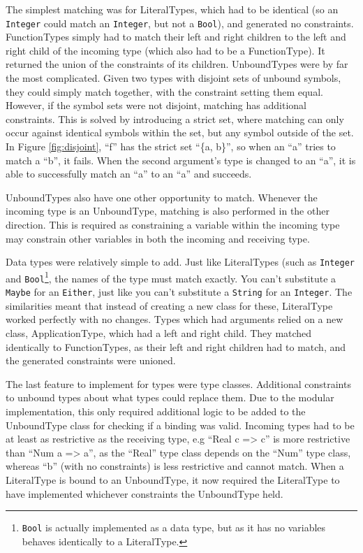 The simplest matching was for LiteralTypes, which had to be identical (so an \texttt{Integer} could match an \texttt{Integer}, but not a \texttt{Bool}), and generated no constraints.
FunctionTypes simply had to match their left and right children to the left and right child of the incoming type (which also had to be a FunctionType). It returned the union of the constraints of its children.
UnboundTypes were by far the most complicated. Given two types with disjoint sets of unbound symbols, they could simply match together, with the constraint setting them equal. However, if the symbol sets were not disjoint, matching has additional constraints. This is solved by introducing a strict set, where matching can only occur against identical symbols within the set, but any symbol outside of the set. In Figure \ref{fig:disjoint}, ``f'' has the strict set ``\{a, b\}'', so when an ``a'' tries to match a ``b'', it fails. When the second argument's type is changed to an ``a'', it is able to successfully match an ``a'' to an ``a'' and succeeds. 

UnboundTypes also have one other opportunity to match. Whenever the incoming type is an UnboundType, matching is also performed in the other direction. This is required as constraining a variable within the incoming type may constrain other variables in both the incoming and receiving type.

Data types were relatively simple to add. Just like LiteralTypes (such as \texttt{Integer} and \texttt{Bool}\footnote{\texttt{Bool} is actually implemented as a data type, but as it has no variables behaves identically to a LiteralType.}, the names of the type must match exactly. You can't substitute a \texttt{Maybe} for an \texttt{Either}, just like you can't substitute a \texttt{String} for an \texttt{Integer}. The similarities meant that instead of creating a new class for these, LiteralType worked perfectly with no changes.
Types which had arguments relied on a new class, ApplicationType, which had a left and right child. They matched identically to FunctionTypes, as their left and right children had to match, and the generated constraints were unioned.

The last feature to implement for types were type classes. Additional constraints to unbound types about what types could replace them. Due to the modular implementation, this only required additional logic to be added to the UnboundType class for checking if a binding was valid. Incoming types had to be at least as restrictive as the receiving type, e.g ``Real c => c'' is more restrictive than ``Num a => a'', as the ``Real'' type class depends on the ``Num'' type class, whereas ``b'' (with no constraints) is less restrictive and cannot match. When a LiteralType is bound to an UnboundType, it now required the LiteralType to have implemented whichever constraints the UnboundType held.  


